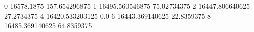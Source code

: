 0 16578.1875 157.654296875
1 16495.560546875 75.02734375
2 16447.806640625 27.2734375
4 16420.533203125 0.0
6 16443.369140625 22.8359375
8 16485.369140625 64.8359375
